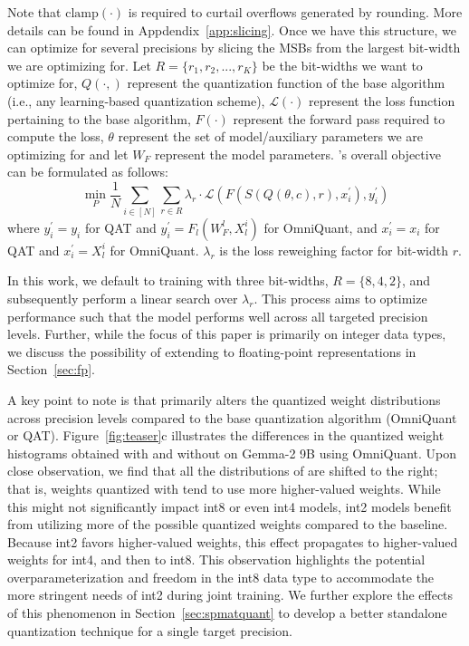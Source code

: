 Note that $\text{clamp}(\cdot)$ is required to curtail overflows generated by rounding. More details can be found in Appdendix~\ref{app:slicing}. Once we have this structure, we can optimize for several precisions by slicing the MSBs from the largest bit-width we are optimizing for. Let $R = \{r_1, r_2, . . ., r_K\}$ be the bit-widths we want to optimize for, $Q(\cdot,)$ represent the quantization function of the base algorithm (i.e., any learning-based quantization scheme), $\mathcal{L}(\cdot)$ represent the loss function pertaining to the base algorithm, $F(\cdot)$ represent the forward pass required to compute the loss, $\theta$ represent the set of model/auxiliary parameters we are optimizing for and let $W_F$ represent the model parameters. \alg's overall objective can be formulated as follows:
\begin{equation}
\label{eqn:matquant}
    \min_{P} \frac{1}{N} \sum_{i \in [N]} \sum_{r \in R} \lambda_{r}\cdot \mathcal{L}\left(F(S(Q(\theta, c), r), x^{\prime}_i), y^{\prime}_{i}\right)
\end{equation}
where $y^{\prime}_{i} = y_i$ for QAT and $y^{\prime}_{i} =  F_l(W^l_F, X_l^i)$ for OmniQuant, and $x^{\prime}_i = x_i$ for QAT and $x^{\prime}_i = X_l^i$ for OmniQuant. $\lambda_{r}$ is the loss reweighing factor for bit-width $r$.


In this work, we default to training \alg with three bit-widths, $R = \{8, 4, 2\}$, and subsequently perform a linear search over  $\lambda_{r}$. This process aims to optimize performance such that the model performs well across all targeted precision levels. Further, while the focus of this paper is primarily on integer data types, we discuss the possibility of extending \alg to floating-point representations in Section~\ref{sec:fp}.

A key point to note is that \alg primarily alters the quantized weight distributions across precision levels compared to the base quantization algorithm (OmniQuant or QAT). Figure~\ref{fig:teaser}c illustrates the differences in the quantized weight histograms obtained with and without \alg on Gemma-2 9B using OmniQuant. Upon close observation, we find that all the distributions of \alg are shifted to the right; that is, weights quantized with \alg tend to use more higher-valued weights. While this might not significantly impact int8 or even int4 models, int2 models benefit from utilizing more of the possible quantized weights compared to the baseline. Because int2 favors higher-valued weights, this effect propagates to higher-valued weights for int4, and then to int8. This observation highlights the potential overparameterization and freedom in the int8 data type to accommodate the more stringent needs of int2 during joint training. We further explore the effects of this phenomenon in Section~\ref{sec:spmatquant} to develop a better standalone quantization technique for a single target precision.


